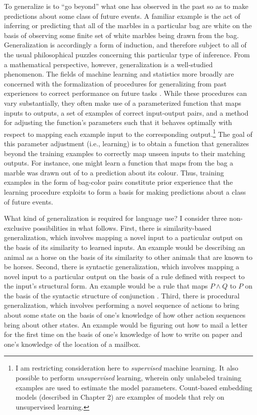 To generalize is to ``go beyond'' what one has observed in the past so as to make predictions about some class of future events. A familiar example is the act of inferring or predicting that all of the marbles in a particular bag are white on the basis of observing some finite set of white marbles being drawn from the bag. Generalization is accordingly a form of induction, and therefore subject to all of the usual philosophical puzzles concerning this particular type of inference. From a mathematical perspective, however, generalization is a well-studied phenomenon. The fields of machine learning and statistics more broadly are concerned with the formalization of procedures for generalizing from past experiences to correct performance on future tasks \citep[][p. 6]{LiangPotts:2015}. While these procedures can vary substantially, they often make use of a parameterized function that maps inputs to outputs, a set of examples of correct input-output pairs, and a method for adjusting the function's parameters such that it behaves optimally with respect to mapping each example input to the corresponding output.\footnote{I am restricting consideration here to \textit{supervised} machine learning. It also possible to perform \textit{unsupervised} learning, wherein only unlabeled training examples are used to estimate the model parameters. Count-based embedding models (described in Chapter 2) are examples of models that rely on unsupervised learning.} The goal of this parameter adjustment (i.e., learning) is to obtain a function that generalizes beyond the training examples to correctly map unseen inputs to their matching outputs. For instance, one might learn a function that maps from the bag a marble was drawn out of to a prediction about its colour. Thus, training examples in the form of bag-color pairs constitute prior experience that the learning procedure exploits to form a basis for making predictions about a class of future events. 

What kind of generalization is required for language use? I consider three non-exclusive possibilities in what follows. First, there is similarity-based generalization, which involves mapping a novel input to a particular output on the basis of its similarity to learned inputs. An example would be describing an animal as a horse on the basis of its similarity to other animals that are known to be horses. Second, there is syntactic generalization, which involves mapping a novel input to a particular output on the basis of a rule defined with respect to the input's structural form. An example would be a rule that maps $P \land Q$ to $P$ on the basis of the syntactic structure of conjunction \citep{FodorPylyshyn:1988}. Third, there is procedural generalization, which involves performing a novel sequence of actions to bring about some state on the basis of one's knowledge of how other action sequences bring about other states. An example would be figuring out how to mail a letter for the first time on the basis of one's knowledge of how to write on paper and one's knowledge of the location of a mailbox. 

